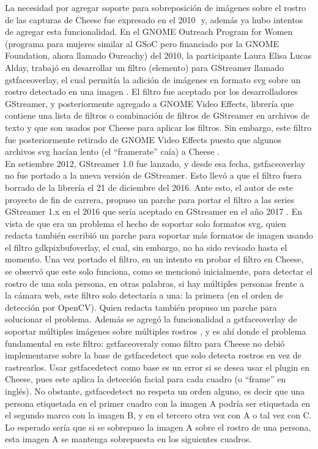 \documentclass[a4paper,openright,12pt]{report}
\begin{document}
La necesidad por agregar soporte para sobreposición de imágenes sobre el rostro
de las capturas de Cheese fue expresado en el 2010 ⁠\cite{Bug6279256} y, además
ya hubo intentos de agregar esta funcionalidad. En el GNOME Outreach Program for
Women (programa para mujeres similar al GSoC pero financiado por la GNOME
Foundation, ahora llamado Oureachy) del 2010, la participante Laura Elisa Lucas
Alday, trabajó en desarrollar un filtro (elemento) para GStreamer llamado
gstfaceoverlay, el cual permitía la adición de imágenes en formato svg sobre un
rostro detectado en una imagen \cite{faceoverlay}\cite{gopw1}. El
filtro fue aceptado por los desarrolladores GStreamer, y posteriormente agregado
a GNOME Video Effects, librería que contiene una lista de filtros o combinación
de filtros de GStreamer en archivos de texto y que son usados por Cheese para
aplicar los filtros. Sin embargo, este filtro fue posteriormente retirado de
GNOME Video Effects puesto que algunos archivos svg hacían lento (el “framerate”
caía) a Cheese \cite{Bug6641489}.\\


En setiembre 2012, GStreamer 1.0 fue lanzado, y desde esa fecha,
gstfaceoverlay no fue portado a la nueva versión de
GStreamer. Esto llevó a que el filtro fuera borrado de la librería el
21 de diciembre del 2016. Ante esto, el autor de este proyecto de fin de
carrera, propuso un parche para portar el filtro a las series GStreamer 1.x en
el 2016 que sería aceptado en GStreamer en el año 2017 \cite{Bug7691771}.
En vista de que era un problema el hecho de soportar solo
formatos svg, quien redacta también escribió un parche para soportar más formatos
de imagen usando el filtro gdkpixbufoverlay, el cual, sin embargo, no ha sido
revisado hasta el momento. Una vez portado el filtro, en un intento en probar
el filtro en Cheese, se observó que este solo funciona, como se mencionó
inicialmente, para detectar el rostro de una sola persona, en otras palabras,
si hay múltiples personas frente a la cámara web, este filtro solo detectaría a
una: la primera (en el orden de detección por OpenCV). Quien redacta también
propuso un parche para solucionar el problema. Además se agregó la funcionalidad
a gstfaceoverlay de soportar múltiples imágenes sobre múltiples rostros
\cite{Bug769176}, y es ahí donde el problema fundamental en este filtro:
gstfaceoveraly como filtro para Cheese no debió implementarse sobre la base de
gstfacedetect que solo detecta rostros en vez de rastrearlos. Usar gstfacedetect
como base es un error si se desea usar el plugin en Cheese, pues este aplica la
detección facial para cada cuadro (o “frame” en inglés). No obstante,
gstfacedetect no respeta un orden alguno, es decir que una persona etiquetada en
el primer cuadro con la imagen A podría ser etiquetada en el segundo marco con
la imagen B, y en el tercero otra vez con A o tal vez con C. Lo esperado sería
que si se sobrepuso la imagen A sobre el rostro de una persona, esta imagen A
se mantenga sobrepuesta en los siguientes cuadros.\\
\end{document}
